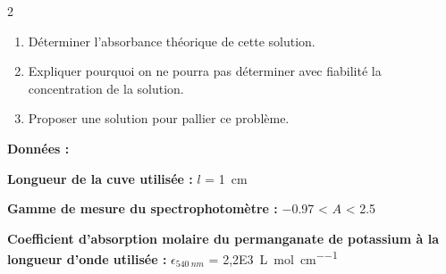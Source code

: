 \documentclass[a4paper,11pt,fleqn]{article}%
\begin{document}
\begin{multicols}{2}
\begin{enumerate}
    \item Déterminer l'absorbance théorique de cette solution.
    \item Expliquer pourquoi on ne pourra pas déterminer avec fiabilité la concentration de la solution.
    \item Proposer une solution pour pallier ce problème.
\end{enumerate}
\noindent \colorbox{red!10}{
    \begin{minipage}{.95\linewidth}
    \textbf{Données :}
    \begin{itemize**}
        \item \textbf{Longueur de la cuve utilisée :} $l$ = \SI{1}{cm}
        \item \textbf{Gamme de mesure du spectrophotomètre :} \num{-0,97} < $A$ < \num{2,5}
        \item \textbf{Coefficient d'absorption molaire du permanganate de potassium à la longueur d'onde utilisée :} $\epsilon_{540~nm}$ = \SI{2,2E3}{\liter\per\mole\per\centi\meter}
    \end{itemize**}
    \end{minipage}}


\end{multicols}
\end{document}
